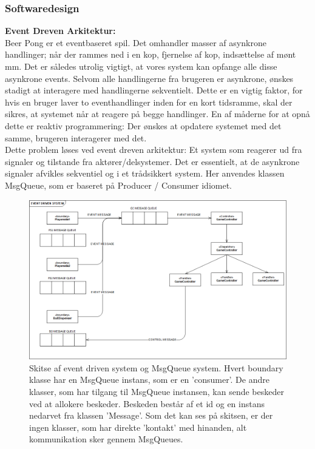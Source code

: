\documentclass[Rapport/Rapport_main.tex]{subfiles}
\begin{document}
\subsubsection{Softwaredesign}
\textbf{Event Dreven Arkitektur:} \\
Beer Pong er et eventbaseret spil. Det omhandler masser af asynkrone handlinger; når der rammes ned i en kop, fjernelse af kop, indsættelse af mønt mm. Det er således utrolig vigtigt, at vores system kan opfange alle disse asynkrone events. Selvom alle handlingerne fra brugeren er asynkrone, ønskes stadigt at interagere med handlingerne sekventielt. Dette er en vigtig faktor, for hvis en bruger laver to eventhandlinger inden for en kort tidsramme, skal der sikres, at systemet når at reagere på begge handlinger. En af måderne for at opnå dette er reaktiv programmering: Der ønskes at opdatere systemet med det samme, brugeren interagerer med det. \\
Dette problem løses ved event dreven arkitektur: Et system som reagerer ud fra signaler og tilstande fra aktører/delsystemer. Det er essentielt, at de asynkrone signaler afvikles sekventiel og i et trådsikkert system. Her anvendes klassen MsgQueue, som er baseret på Producer / Consumer idiomet.\autocite{Wiki_prod}
\begin{figure}[H]
    \centering
    \includegraphics[width=1\textwidth]{Softwaredesign/RPiApp/graphic_RPi/EDS.png}
    \caption{Skitse af event driven system og MsgQueue system. Hvert boundary klasse har en MsgQueue instans, som er en 'consumer'. De andre klasser, som har tilgang til MsgQueue instansen, kan sende beskeder ved at allokere beskeder. Beskeden består af et id og en instans nedarvet fra klassen 'Message'. Som det kan ses på skitsen, er der ingen klasser, som har direkte 'kontakt' med hinanden, alt kommunikation sker gennem MsgQueues.}
   \label{fig:Sketch_Event}
\end{figure}
\end{document}
